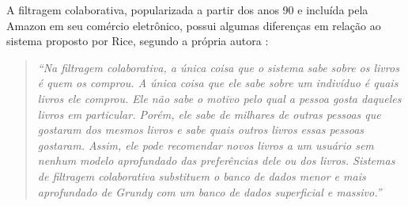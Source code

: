 A filtragem colaborativa, popularizada a partir dos anos 90 e
incluída pela Amazon \cite{amazon2017} em seu comércio eletrônico, possui
algumas diferenças em relação ao sistema proposto por Rice, segundo a própria
autora \cite{rich:homepage}:

\begin{quotation}\small\noindent \textit{``Na filtragem colaborativa, a única
   coisa que o sistema sabe sobre os livros é quem os comprou. A única coisa que
   ele sabe sobre um indivíduo é quais livros ele comprou. Ele não sabe o motivo
   pelo qual a pessoa gosta daqueles livros em particular. Porém, ele sabe de
   milhares de outras pessoas que gostaram dos mesmos livros e sabe quais outros
   livros essas pessoas gostaram. Assim, ele pode recomendar novos livros a um
   usuário sem nenhum modelo aprofundado das preferências dele ou dos livros.
   Sistemas de filtragem colaborativa substituem o banco de dados menor e mais
   aprofundado de Grundy com um banco de dados superficial e massivo.''}
   \end{quotation}





